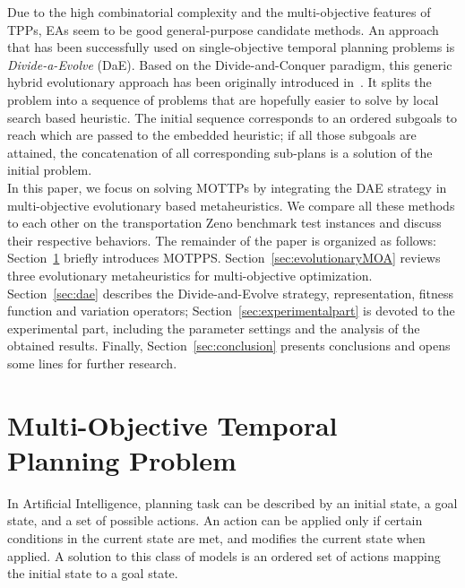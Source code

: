\documentclass{llncs}
\begin{document}
\indent Due to the  high combinatorial complexity and the multi-objective features of TPPs, EAs seem to be good general-purpose candidate 
methods. An approach that has been successfully used on  single-objective temporal planning  problems is \textit{Divide-a-Evolve} (DaE).
Based on the  Divide-and-Conquer paradigm, this generic hybrid evolutionary approach has been originally introduced in~\cite{Schoenauer2006}.   
It splits the problem into a sequence of problems that are hopefully easier to solve by local search based heuristic. 
The initial sequence corresponds to an ordered subgoals to reach which are passed to the embedded heuristic; if all those subgoals are attained, the concatenation of all corresponding sub-plans is a solution of the initial problem.\\
\indent In this paper, we focus on solving MOTTPs by integrating the DAE strategy in  multi-objective evolutionary based metaheuristics.
We compare all these methods to each other on  the transportation Zeno benchmark  test instances and discuss their respective behaviors.
The remainder of the paper is organized as follows: Section~\ref{sec:multi-objective_tpp}  briefly introduces MOTPPS. Section~\ref{sec:evolutionaryMOA}  reviews three  evolutionary metaheuristics for multi-objective optimization. Section~\ref{sec:dae} describes the Divide-and-Evolve strategy, representation, fitness function and variation operators; 
Section~\ref{sec:experimentalpart} is devoted to the experimental part, including the parameter settings and the  analysis of the obtained results.  Finally, Section~\ref{sec:conclusion} presents conclusions and opens some lines for further research.

 


\section{Multi-Objective Temporal Planning Problem}
\label{sec:multi-objective_tpp}

In Artificial Intelligence, planning task can be described by  an initial state, a goal state, and a set of possible actions.  An action can be applied only if certain conditions in the current state are met, and modifies 
the current state when applied. A solution to this class of models is an ordered set of actions mapping the initial state to a goal state.
 
\end{document}
